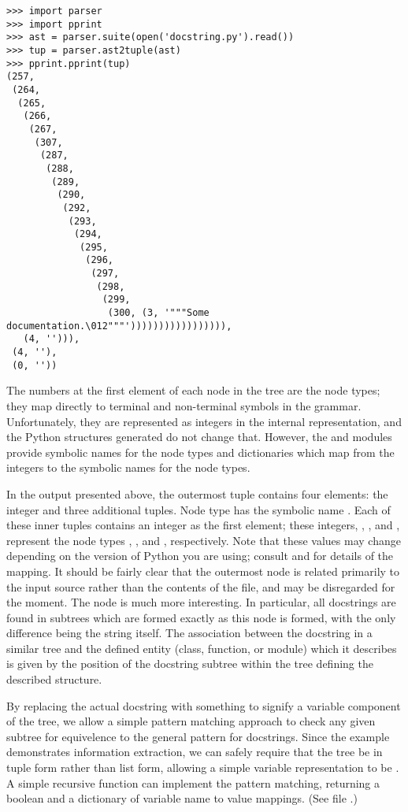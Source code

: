 \begin{verbatim}
>>> import parser
>>> import pprint
>>> ast = parser.suite(open('docstring.py').read())
>>> tup = parser.ast2tuple(ast)
>>> pprint.pprint(tup)
(257,
 (264,
  (265,
   (266,
    (267,
     (307,
      (287,
       (288,
        (289,
         (290,
          (292,
           (293,
            (294,
             (295,
              (296,
               (297,
                (298,
                 (299,
                  (300, (3, '"""Some documentation.\012"""'))))))))))))))))),
   (4, ''))),
 (4, ''),
 (0, ''))
\end{verbatim}
%
The numbers at the first element of each node in the tree are the node
types; they map directly to terminal and non-terminal symbols in the
grammar.  Unfortunately, they are represented as integers in the
internal representation, and the Python structures generated do not
change that.  However, the  and  modules
provide symbolic names for the node types and dictionaries which map
from the integers to the symbolic names for the node types.

In the output presented above, the outermost tuple contains four
elements: the integer  and three additional tuples.  Node
type  has the symbolic name .  Each of
these inner tuples contains an integer as the first element; these
integers, , , and , represent the node types
, , and ,
respectively.
Note that these values may change depending on the version of Python
you are using; consult  and  for
details of the mapping.  It should be fairly clear that the outermost
node is related primarily to the input source rather than the contents
of the file, and may be disregarded for the moment.  The 
node is much more interesting.  In particular, all docstrings are
found in subtrees which are formed exactly as this node is formed,
with the only difference being the string itself.  The association
between the docstring in a similar tree and the defined entity (class,
function, or module) which it describes is given by the position of
the docstring subtree within the tree defining the described
structure.

By replacing the actual docstring with something to signify a variable
component of the tree, we allow a simple pattern matching approach to
check any given subtree for equivelence to the general pattern for
docstrings.  Since the example demonstrates information extraction, we
can safely require that the tree be in tuple form rather than list
form, allowing a simple variable representation to be
.  A simple recursive function can implement
the pattern matching, returning a boolean and a dictionary of variable
name to value mappings.  (See file .)

